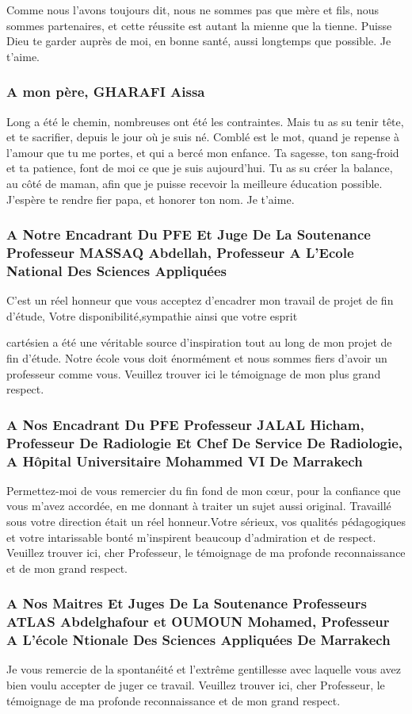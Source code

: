 \documentclass[12pt]{report}
\begin{document}
        Comme nous l’avons toujours dit, nous ne sommes pas que mère et fils, nous sommes partenaires, et cette réussite est autant la mienne que la tienne. Puisse Dieu te garder auprès de moi, en bonne santé, aussi longtemps que possible. Je t’aime.
        \subsubsection*{A mon père, GHARAFI Aissa }
        Long a été le chemin, nombreuses ont été les contraintes. Mais tu as su tenir tête, et te sacrifier, depuis le jour où je suis né. Comblé est le mot, quand je repense à l’amour que tu me portes, et qui a bercé mon enfance. Ta sagesse, ton sang-froid et ta patience, font de moi ce que je suis aujourd’hui. Tu as su créer la balance, au côté de maman, afin que je puisse recevoir la meilleure éducation possible. J’espère te rendre fier papa, et honorer ton nom. Je t’aime.
        \subsubsection*{A Notre Encadrant Du PFE Et Juge De La Soutenance Professeur MASSAQ Abdellah, Professeur A L'Ecole National Des Sciences Appliquées }
        C’est un réel honneur que vous acceptez d'encadrer mon travail de projet de fin d'étude, Votre disponibilité,sympathie ainsi que votre esprit

        cartésien a été une véritable source d'inspiration tout au long de mon projet de fin d'étude. Notre école vous doit énormément et nous sommes fiers d’avoir un professeur comme vous. Veuillez trouver ici le témoignage de mon plus grand respect.
        \subsubsection*{A Nos Encadrant Du PFE Professeur JALAL Hicham, Professeur De Radiologie Et Chef De Service De Radiologie, A Hôpital Universitaire Mohammed VI De Marrakech }
        Permettez-moi de vous remercier du fin fond de mon cœur, pour la confiance que vous m’avez accordée, en me donnant à traiter un sujet aussi original. Travaillé sous votre direction était un réel honneur.Votre sérieux, vos qualités pédagogiques et votre intarissable bonté m’inspirent beaucoup d’admiration et de respect. Veuillez trouver ici, cher Professeur, le témoignage de ma profonde reconnaissance et de mon grand respect.

        \subsubsection*{A Nos Maitres Et Juges De La Soutenance Professeurs ATLAS Abdelghafour et OUMOUN Mohamed, Professeur A L'école Ntionale Des Sciences Appliquées De Marrakech}
        Je vous remercie de la spontanéité et l'extrême gentillesse avec laquelle vous avez bien voulu accepter de juger ce travail. Veuillez trouver ici, cher Professeur, le témoignage de ma profonde reconnaissance et de mon grand respect.
\end{document}

